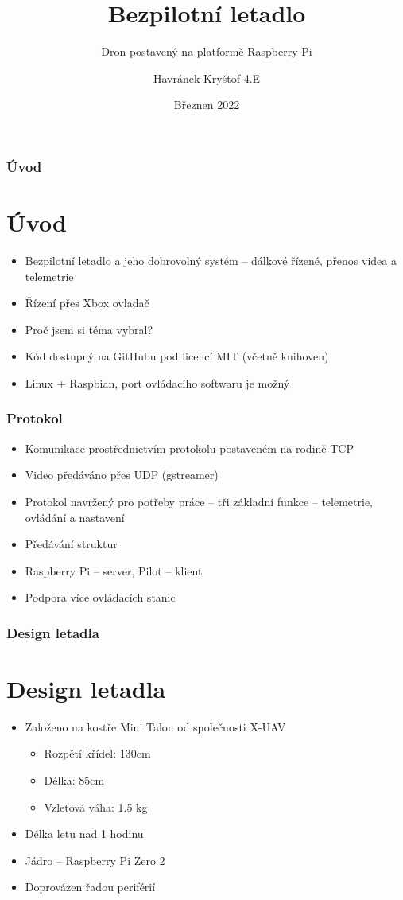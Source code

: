 \documentclass[aspectratio=43]{beamer}
\title{Bezpilotní letadlo}
\subtitle{Dron postavený na platformě Raspberry Pi}
\author{Havránek Kryštof 4.E}
\date{Březnen 2022}
\institute{Gymnázium, Praha 6, Arabská 14}
\begin{document}
\begin{frame}[plain]
	\maketitle
\end{frame}

\clearpage
\setcounter{framenumber}{0}

\begin{frame}[fragile]
	\frametitle{Úvod}
	\section{Úvod}

	\begin{itemize}
		\item Bezpilotní letadlo a jeho dobrovolný systém -- dálkové řízené, přenos videa a telemetrie
		\item Řízení přes Xbox ovladač
		\item Proč jsem si téma vybral?
		\item Kód dostupný na GitHubu pod licencí MIT (včetně knihoven)
		\item Linux + Raspbian, port ovládacího softwaru je možný
	\end{itemize}
\end{frame}

\begin{frame}[fragile]
	\frametitle{Protokol}
	\begin{itemize}
		\item Komunikace prostřednictvím protokolu postaveném na rodině TCP
		\item Video předáváno přes UDP (gstreamer)
		\item Protokol navržený pro potřeby práce -- tři základní funkce -- telemetrie, ovládání a nastavení
		\item Předávání struktur
		\item Raspberry Pi -- server, Pilot -- klient
		\item Podpora více ovládacích stanic
	\end{itemize}
\end{frame}

\begin{frame}[fragile]
	\frametitle{Design letadla}
	\section{Design letadla}
	\begin{itemize}
		\item Založeno na kostře Mini Talon od společnosti X-UAV
			\begin{itemize}
				\item Rozpětí křídel: 130cm
				\item Délka: 85cm
				\item Vzletová váha: 1.5 kg
			\end{itemize}
		\item Délka letu nad 1 hodinu
		\item Jádro -- Raspberry Pi Zero 2
		\item Doprovázen řadou periférií
	\end{itemize}
\end{frame}
\end{document}
